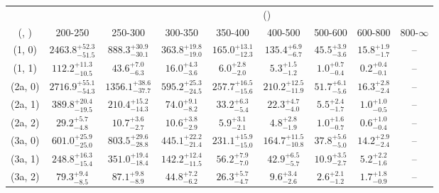 \begin{table}[h!]
\tiny
\centering
{}
\begin{tabular}
{ccccccccc}
	\hline\hline
&	& \multicolumn{8}{c}{\scalht (\gev)} \\ 
	 (\njet,  \nb) & 200-250 & 250-300 & 300-350 & 350-400 & 400-500 & 500-600 & 600-800 & 800-$\infty$ \\ [0.8ex] 
\hline
	(1, 0) & $2463.8^{+ 52.3 }_{- 51.5 }$ & $888.3^{+ 30.9 }_{- 30.1 }$ & $363.8^{+ 19.8 }_{- 19.0 }$ & $165.0^{+ 13.1 }_{- 12.3 }$ & $135.4^{+ 6.9 }_{- 6.7 }$ & $45.5^{+ 3.9 }_{- 3.6 }$ & $15.8^{+ 1.9 }_{- 1.7 }$ & -- \\[0.5ex] 
	(1, 1) & $112.2^{+ 11.3 }_{- 10.5 }$ & $43.6^{+ 7.0 }_{- 6.3 }$ & $16.0^{+ 4.3 }_{- 3.6 }$ & $6.0^{+ 2.8 }_{- 2.0 }$ & $5.3^{+ 1.5 }_{- 1.2 }$ & $1.0^{+ 0.7 }_{- 0.4 }$ & $0.2^{+ 0.4 }_{- 0.1 }$ & -- \\[0.5ex] 
	(2a, 0) & $2716.9^{+ 55.1 }_{- 54.3 }$ & $1356.1^{+ 38.6 }_{- 37.7 }$ & $595.2^{+ 25.3 }_{- 24.5 }$ & $257.7^{+ 16.5 }_{- 15.6 }$ & $210.2^{+ 12.5 }_{- 11.9 }$ & $51.7^{+ 6.1 }_{- 5.6 }$ & $16.3^{+ 2.8 }_{- 2.4 }$ & -- \\[0.5ex] 
	(2a, 1) & $389.8^{+ 20.4 }_{- 19.5 }$ & $210.4^{+ 15.2 }_{- 14.3 }$ & $74.0^{+ 9.1 }_{- 8.2 }$ & $33.2^{+ 6.3 }_{- 5.4 }$ & $22.3^{+ 4.7 }_{- 4.0 }$ & $5.5^{+ 2.4 }_{- 1.7 }$ & $1.0^{+ 1.0 }_{- 0.5 }$ & -- \\[0.5ex] 
	(2a, 2) & $29.2^{+ 5.7 }_{- 4.8 }$ & $10.7^{+ 3.6 }_{- 2.7 }$ & $10.6^{+ 3.8 }_{- 2.9 }$ & $5.9^{+ 3.1 }_{- 2.1 }$ & $4.8^{+ 2.8 }_{- 1.9 }$ & $1.0^{+ 1.6 }_{- 0.7 }$ & $0.6^{+ 1.0 }_{- 0.4 }$ & -- \\[0.5ex] 
	(3a, 0) & $601.0^{+ 25.9 }_{- 25.0 }$ & $803.5^{+ 29.6 }_{- 28.8 }$ & $445.1^{+ 22.2 }_{- 21.4 }$ & $231.1^{+ 15.9 }_{- 15.0 }$ & $164.7^{+ 11.5 }_{- 10.8 }$ & $37.8^{+ 5.6 }_{- 5.0 }$ & $14.2^{+ 2.9 }_{- 2.4 }$ & -- \\[0.5ex] 
	(3a, 1) & $248.8^{+ 16.3 }_{- 15.4 }$ & $351.0^{+ 19.4 }_{- 18.4 }$ & $142.2^{+ 12.4 }_{- 11.5 }$ & $56.2^{+ 7.9 }_{- 7.0 }$ & $42.9^{+ 6.5 }_{- 5.7 }$ & $10.9^{+ 3.5 }_{- 2.7 }$ & $5.2^{+ 2.2 }_{- 1.6 }$ & -- \\[0.5ex] 
	(3a, 2) & $79.3^{+ 9.4 }_{- 8.5 }$ & $87.1^{+ 9.8 }_{- 8.9 }$ & $44.8^{+ 7.2 }_{- 6.2 }$ & $26.3^{+ 5.7 }_{- 4.7 }$ & $9.6^{+ 3.4 }_{- 2.6 }$ & $2.6^{+ 2.1 }_{- 1.2 }$ & $1.7^{+ 1.8 }_{- 0.9 }$ & -- \\[0.5ex] 

\end{tabular}
\end{table}
